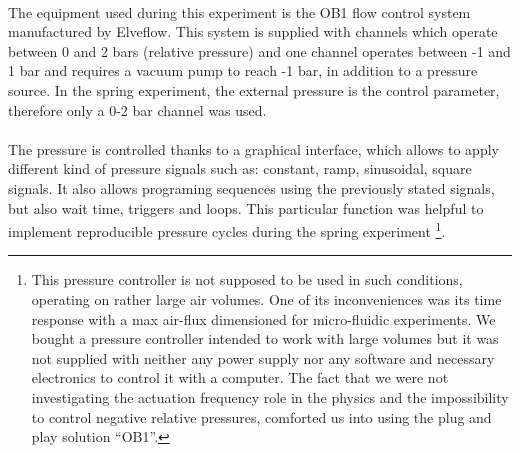 \paragraph{}
The equipment used during this experiment is the OB1 flow control system manufactured by Elveflow\textcopyright. This system is supplied with channels which operate between 0 and 2 bars (relative pressure) and one channel operates between -1 and 1 bar and requires a vacuum pump to reach -1 bar, in addition to a pressure source.
In the spring experiment, the external pressure is the control parameter, therefore only a 0-2 bar channel was used.
\paragraph{}
The pressure is controlled thanks to a graphical interface, which allows to apply different kind of pressure signals such as: constant, ramp, sinusoidal, square signals. It also allows programing sequences using the previously stated signals, but also wait time, triggers and loops. This particular function was helpful to implement reproducible pressure cycles during the spring experiment
\footnote{
This pressure controller is not supposed to be used in such conditions, operating on rather large air volumes. One of its inconveniences was its time response with a max air-flux dimensioned for micro-fluidic experiments. We bought a pressure controller intended to work with large volumes but it was not supplied with neither any power supply nor any software and necessary electronics to control it with a computer. The fact that we were not investigating the actuation frequency role in the physics and the impossibility to control negative relative pressures, comforted us into using the plug and play solution "`OB1"'.}.



